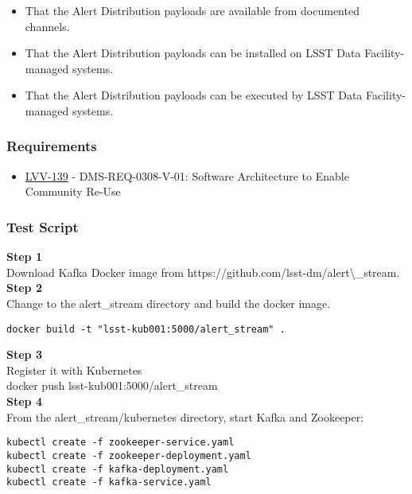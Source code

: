 \begin{itemize}
\tightlist
\item
  That the Alert Distribution payloads are available from documented
  channels.
\item
  That the Alert Distribution payloads can be installed on LSST Data
  Facility-managed systems.
\item
  That the Alert Distribution payloads can be executed by LSST Data
  Facility-managed systems.
\end{itemize}

\subsubsection{Requirements}\label{requirements-6}

\begin{itemize}
\tightlist
\item
  \href{https://jira.lsstcorp.org/browse/LVV-139}{LVV-139} -
  DMS-REQ-0308-V-01: Software Architecture to Enable Community Re-Use
\end{itemize}

\subsubsection{Test Script}\label{test-script-6}

\textbf{Step 1}\\
Download Kafka Docker image from
https://github.com/lsst-dm/alert\textbackslash{}\_stream.\\[2\baselineskip]\textbf{Step
2}\\
Change to the alert\_stream directory and build the docker image.\\

\begin{verbatim}
docker build -t "lsst-kub001:5000/alert_stream" .
\end{verbatim}

\textbf{Step 3}\\
Register it with Kubernetes\\[2\baselineskip]docker push
lsst-kub001:5000/alert\_stream\\[2\baselineskip]\textbf{Step 4}\\
From the alert\_stream/kubernetes directory, start Kafka and
Zookeeper:\\[2\baselineskip]

\begin{verbatim}
kubectl create -f zookeeper-service.yaml
kubectl create -f zookeeper-deployment.yaml
kubectl create -f kafka-deployment.yaml
kubectl create -f kafka-service.yaml
\end{verbatim}

